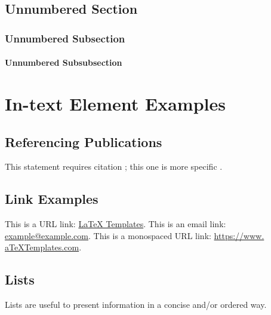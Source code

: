 \documentclass[
	11pt, %
	fleqn, %
	a4paper, %
]{LegrandOrangeBook}
\begin{document}

\section*{Unnumbered Section}

\subsection*{Unnumbered Subsection}

\subsubsection*{Unnumbered Subsubsection}



\chapter{In-text Element Examples}


\section{Referencing Publications}
This statement requires citation \cite{Smith:2022jd}; this one is more specific \cite[162]{Smith:2021qr}.



\section{Link Examples}

This is a URL link: \href{https://www.latextemplates.com}{LaTeX Templates}.
This is an email link: \href{mailto:example@example.com}{example@example.com}.
This is a monospaced URL link: \url{https://www.
aTeXTemplates.com}.



\section{Lists}
Lists are useful to present information in a concise and/or ordered way.
\end{document}
